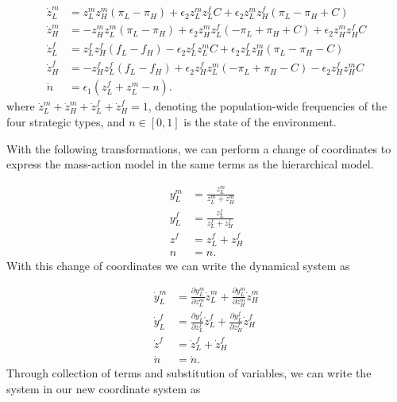 \documentclass{article}
\begin{document}
\begin{align*}
\dot{z}_L^m &= z_L^m z_H^m (\pi_L-\pi_H) + \epsilon_2 z_L^m z_L^f C + \epsilon_2 z_L^m z_H^f (\pi_L-\pi_H+C)\\
\dot{z}_H^m &= - z_H^m z_L^m (\pi_L-\pi_H) + \epsilon_2 z_H^m z_L^f (-\pi_L+\pi_H+C) + \epsilon_2 z_H^m z_H^f C\\
\dot{z}_L^f &= z_L^f z_H^f (f_L-f_H) - \epsilon_2 z_L^f z_L^m C + \epsilon_2 z_L^f z_H^m (\pi_L-\pi_H-C)\\
\dot{z}_H^f &= -z_H^f z_L^f (f_L-f_H) + \epsilon_2 z_H^f z_L^m (-\pi_L+\pi_H-C) - \epsilon_2 z_H^f z_H^m C\\
\dot{n}_{~} &= \epsilon_1(z_L^f+z_L^m-n).
\end{align*}
where $\dot{z}_L^m+\dot{z}_H^m+\dot{z}_L^f+\dot{z}_H^f=1$, denoting the population-wide frequencies of the four strategic types, and $n\in[0,1]$ is the state of the environment.

With the following transformations, we can perform a change of coordinates to express the mass-action model in the same terms as the hierarchical model.

\begin{align}
    y_L^m &= \frac{z_L^m}{z_L^m+z_H^m}\\
    y_L^f &= \frac{z_L^f}{z_L^f+z_H^f}\\
    z^f &= z_L^f+z_H^f\\
    n &= n.
\end{align}
With this change of coordinates we can write the dynamical system as

\begin{align}
    \dot{y}_L^m &= \frac{\partial y_L^m}{\partial z_L^m}\dot{z}_L^m + \frac{\partial y_L^m}{\partial z_H^m}\dot{z}_H^m\\
    \dot{y}_L^f &= \frac{\partial y_L^f}{\partial z_L^f}\dot{z}_L^f + \frac{\partial y_L^f}{\partial z_H^f}\dot{z}_H^f\\
    \dot{z}^f &= \dot{z}_L^f+\dot{z}_H^f\\
    \dot{n} &= \dot{n}.
\end{align}
Through collection of terms and substitution of variables, we can write the system in our new coordinate system as 
\end{document}
